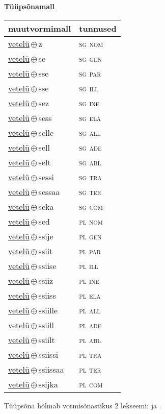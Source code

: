 

\vspace{3.5em}
\noindent \begin{minipage}{\textwidth}
\noindent \textbf{Tüüpsõnamall \,}\\

\begin{sideways}
\begin{tabular}{l l}
muutvormimall & tunnused \\
\hline
\underline{vetelü}\,$\oplus$\,z & \textsc{ sg nom } \\
\underline{vetelü}\,$\oplus$\,se & \textsc{ sg gen } \\
\underline{vetelü}\,$\oplus$\,sse & \textsc{ sg par } \\
\underline{vetelü}\,$\oplus$\,sse & \textsc{ sg ill } \\
\underline{vetelü}\,$\oplus$\,sez & \textsc{ sg ine } \\
\underline{vetelü}\,$\oplus$\,sess & \textsc{ sg ela } \\
\underline{vetelü}\,$\oplus$\,selle & \textsc{ sg all } \\
\underline{vetelü}\,$\oplus$\,sell & \textsc{ sg ade } \\
\underline{vetelü}\,$\oplus$\,selt & \textsc{ sg abl } \\
\underline{vetelü}\,$\oplus$\,sessi & \textsc{ sg tra } \\
\underline{vetelü}\,$\oplus$\,sessaa & \textsc{ sg ter } \\
\underline{vetelü}\,$\oplus$\,seka & \textsc{ sg com } \\
\underline{vetelü}\,$\oplus$\,sed & \textsc{ pl nom } \\
\underline{vetelü}\,$\oplus$\,ssije & \textsc{ pl gen } \\
\underline{vetelü}\,$\oplus$\,ssiit & \textsc{ pl par } \\
\underline{vetelü}\,$\oplus$\,ssiise & \textsc{ pl ill } \\
\underline{vetelü}\,$\oplus$\,ssiiz & \textsc{ pl ine } \\
\underline{vetelü}\,$\oplus$\,ssiiss & \textsc{ pl ela } \\
\underline{vetelü}\,$\oplus$\,ssiille & \textsc{ pl all } \\
\underline{vetelü}\,$\oplus$\,ssiill & \textsc{ pl ade } \\
\underline{vetelü}\,$\oplus$\,ssiilt & \textsc{ pl abl } \\
\underline{vetelü}\,$\oplus$\,ssiissi & \textsc{ pl tra } \\
\underline{vetelü}\,$\oplus$\,ssiissaa & \textsc{ pl ter } \\
\underline{vetelü}\,$\oplus$\,ssijka & \textsc{ pl com } \\
\end{tabular}
\end{sideways}
\label{tab:tüüpsõnamall-vetelüz}

\end{minipage}

 
\vspace{1em}
\noindent Tüüpsõna hõlmab vormisõnastikus 2 lekseemi:  ja .
